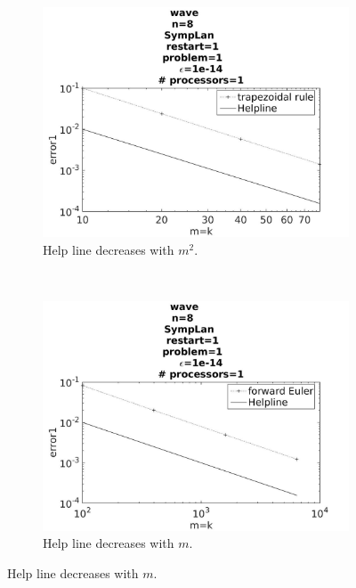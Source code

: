 \begin{figure}[H]
        \centering
        \begin{subfigure}[b]{0.30\textwidth}
                \includegraphics[width=\textwidth]{../MATLAB/fig/intconvtrap.jpg}
                \caption{ Help line decreases with $m^2$. }
                \label{fig:intconvtrap}
        \end{subfigure}%
        ~
        \begin{subfigure}[b]{0.30\textwidth}
                \includegraphics[width=\textwidth]{../MATLAB/fig/intconveul.jpg}
                \caption{ Help line decreases with $m$. }
                \label{fig:intconveul}

\end{subfigure}
\end{figure}
